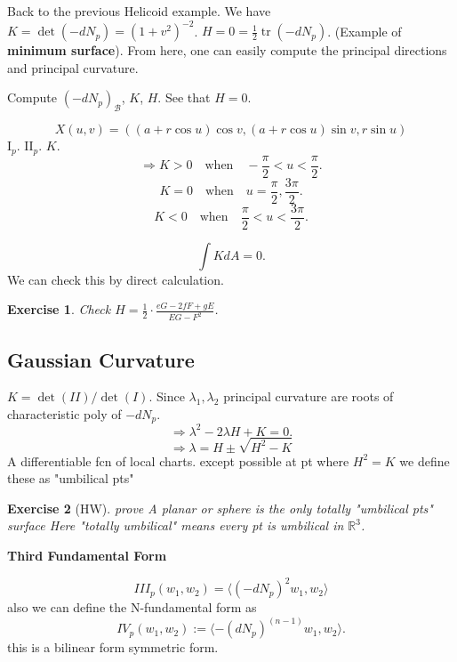 \documentclass{article}
\newtheorem*{exercise}{Exercise}
\begin{document}
\begin{example}
Back to the previous Helicoid example.
We have $K = \det(-dN_p) = (1+v^2)^{-2}$.
$H = 0 = \frac{1}{2} \operatorname{tr}(-dN_p)$. (Example of \textbf{minimum surface}).
From here, one can easily compute the principal directions and principal curvature.
\end{example}

\begin{example}
Compute $(-dN_p)_{\mathcal{B}}$, $K$, $H$. See that $H=0$.
\end{example}

\begin{example}[Torus]
$$ X(u, v) = ((a + r \cos u) \cos v, (a + r \cos u) \sin v, r \sin u) $$
$\mathrm{I}_p$.
$\mathrm{II}_p$.
$K$.
$$ \Rightarrow K > 0 \quad \text{when} \quad -\frac{\pi}{2} < u < \frac{\pi}{2}. $$
$$ K = 0 \quad \text{when} \quad u = \frac{\pi}{2}, \frac{3\pi}{2}. $$
$$ K < 0 \quad \text{when} \quad \frac{\pi}{2} < u < \frac{3\pi}{2}. $$
\end{example}

\begin{remark}
$$ \int K dA = 0. $$
We can check this by direct calculation.
\end{remark}

\begin{exercise}
Check $H = \frac{1}{2} \cdot \frac{e G - 2 f F + g E}{E G - F^2}$.
\end{exercise}

\subsection*{Gaussian Curvature}

$K = \det(II) / \det(I)$.
Since $\lambda_1, \lambda_2$ principal curvature are roots of characteristic poly of $-dN_p$.
\[ \Rightarrow \lambda^2 - 2\lambda H + K = 0. \]
\[ \Rightarrow \lambda = H \pm \sqrt{H^2 - K} \]
A differentiable fcn of local charts.
except possible at pt where $H^2 = K$
we define these as "umbilical pts"

\begin{exercise}[HW]
prove A planar or sphere is the only totally "umbilical pts" surface
Here "totally umbilical" means every pt is umbilical in $\mathbb{R}^3$.
\end{exercise}

\textbf{Third Fundamental Form}

\begin{definition}
\[ III_p(w_1, w_2) = \langle (-dN_p)^2 w_1, w_2 \rangle \]
also we can define the N-fundamental form as
\[ IV_p(w_1, w_2) := \langle -(dN_p)^{(n-1)} w_1, w_2 \rangle. \]
this is a bilinear form symmetric form.
\end{definition}
\end{document}
